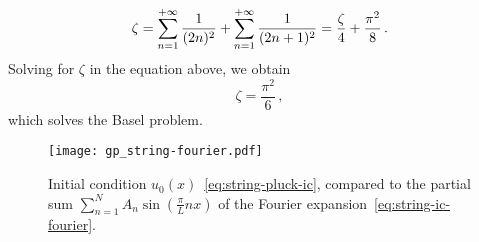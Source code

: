 \begin{equation}
  \zeta=\sum_{n=1}^{+\infty}\frac{1}{(2n)^2}+\sum_{n=1}^{+\infty}\frac{1}{(2n+1)^2}
  =\frac{\zeta}{4}+\frac{\pi^2}{8}\,.
\end{equation}
Solving for $\zeta$ in the equation above, we obtain
\begin{equation}
  \zeta=\frac{\pi^2}{6}\,,
\end{equation}
which solves the Basel problem.
\begin{figure}
  \centering
  \texttt{[image: gp\_string-fourier.pdf]}
  \caption{Initial condition $u_0(x)$~\cref{eq:string-pluck-ic}, compared to the partial
    sum $\sum_{n=1}^N A_n\sin(\frac{\pi}{L}nx)$ of the Fourier
  expansion~\cref{eq:string-ic-fourier}.}
  \label{fig:string-fourier}
\end{figure}
